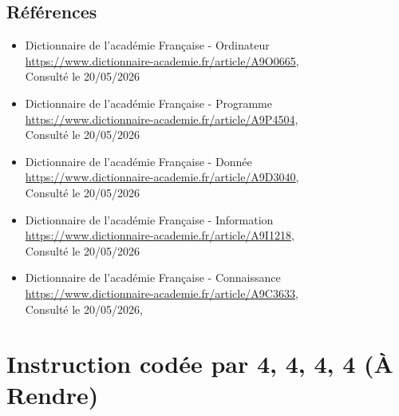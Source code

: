 \begin{graybox}
    \subsection{Références}
    \begin{itemize}
        \item[1] Dictionnaire de l'académie Française - Ordinateur \\
         \url{https://www.dictionnaire-academie.fr/article/A9O0665},\\
         Consulté le 20/05/2026
        \item[2] Dictionnaire de l'académie Française - Programme \\
        \url{https://www.dictionnaire-academie.fr/article/A9P4504},\\
         Consulté le 20/05/2026
        \item[3] Dictionnaire de l'académie Française - Donnée\\
        \url{https://www.dictionnaire-academie.fr/article/A9D3040},\\
         Consulté le 20/05/2026
        \item[4] Dictionnaire de l'académie Française - Information\\
        \url{https://www.dictionnaire-academie.fr/article/A9I1218},\\
         Consulté le 20/05/2026
        \item[5] Dictionnaire de l'académie Française - Connaissance\\
        \url{https://www.dictionnaire-academie.fr/article/A9C3633},\\
         Consulté le 20/05/2026,
    \end{itemize}

\end{graybox}

\newpage


\section{Instruction codée par 4, 4, 4, 4 (À Rendre)}


